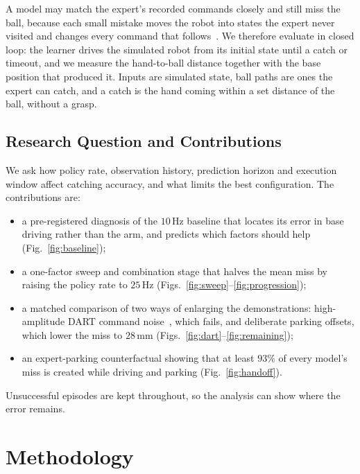 \documentclass[conference]{IEEEtran}
\begin{document}
A model may match the expert's recorded commands closely and still miss the ball, because each small mistake moves the robot into states the expert never visited and changes every command that follows~\cite{ross2011}. We therefore evaluate in closed loop: the learner drives the simulated robot from its initial state until a catch or timeout, and we measure the hand-to-ball distance together with the base position that produced it. Inputs are simulated state, ball paths are ones the expert can catch, and a catch is the hand coming within a set distance of the ball, without a grasp.

\subsection{Research Question and Contributions}
We ask how policy rate, observation history, prediction horizon and execution window affect catching accuracy, and what limits the best configuration. The contributions are:
\begin{itemize}
\item a pre-registered diagnosis of the $10\,\mathrm{Hz}$ baseline that locates its error in base driving rather than the arm, and predicts which factors should help (Fig.~\ref{fig:baseline});
\item a one-factor sweep and combination stage that halves the mean miss by raising the policy rate to $25\,\mathrm{Hz}$ (Figs.~\ref{fig:sweep}--\ref{fig:progression});
\item a matched comparison of two ways of enlarging the demonstrations: high-amplitude DART command noise~\cite{laskey2017}, which fails, and deliberate parking offsets, which lower the miss to $28\,\mathrm{mm}$ (Figs.~\ref{fig:dart}--\ref{fig:remaining});
\item an expert-parking counterfactual showing that at least $93\%$ of every model's miss is created while driving and parking (Fig.~\ref{fig:handoff}).
\end{itemize}
Unsuccessful episodes are kept throughout, so the analysis can show where the error remains.

\section{Methodology}
\end{document}
